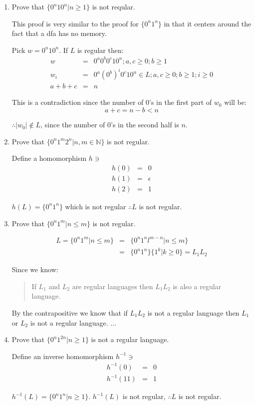 \documentclass[12pt,a4paper,twoside]{article}  %
\begin{document}
\begin{enumerate}
\item Prove that $\{0^n10^n | n \geq 1\}$ is not reqular.

This proof is very similar to the proof for $\{0^n1^n\}$ in that it
centers around the fact that a dfa has no memory.

Pick $w = 0^n10^n$. If $L$ is regular then:
\begin{eqnarray}
w &=& 0^a0^b0^c10^n; a,c \geq 0; b \geq 1 \\
w_i &=& 0^a(0^b)^i0^c10^n \in L; a,c \geq 0; b \geq 1; i \geq 0 \\
a + b + c &=& n
\end{eqnarray}

This is a contradiction since the number of 0's in the first part of
$w_0$ will be:
\begin{equation}
a + c = n - b < n
\end{equation}

$\therefore |w_0| \not \in L$, since the number of 0's in the second half
is $n$.

\item Prove that $\{0^n1^m2^n | n, m \in \mathbb{N}\}$ is not regular.

Define a homomorphism $h \ni$
\begin{eqnarray}
h(0) &=& 0 \\
h(1) &=& \epsilon \\
h(2) &=& 1
\end{eqnarray}

$h(L) = \{0^n1^n\}$ which is not regular $\therefore L$ is not regular.

\item Prove that $\{0^n1^m | n \leq m\}$ is not regular.

\begin{eqnarray}
L = \{0^n1^m | n \leq m\} &=& \{0^n1^nl^{m - n} | n \leq m\} \nonumber\\
                      &=& \{0^n1^n\}\{1^k | k \geq 0\} = L_1L_2
\end{eqnarray}

Since we know:
\begin{quote}
If $L_1$ and $L_2$ are regular languages then $L_1L_2$ is also a regular
language.
\end{quote}

By the contrapositive we know that if $L_1L_2$ is not a regular language
then $L_1$ or $L_2$ is not a regular language. $\ldots$

\item Prove that $\{0^n1^{2n} | n \geq 1\}$ is not a regular language.

Define an inverse homomorphism $h^{-1} \ni$
\begin{eqnarray}
h^{-1}(0) &=& 0 \\
h^{-1}(11) &=& 1
\end{eqnarray}

$h^{-1}(L) = \{0^n1^n | n \geq 1\}$. $h^{-1}(L)$ is not regular,
$\therefore L$ is not regular.

\end{enumerate}
\end{document}
